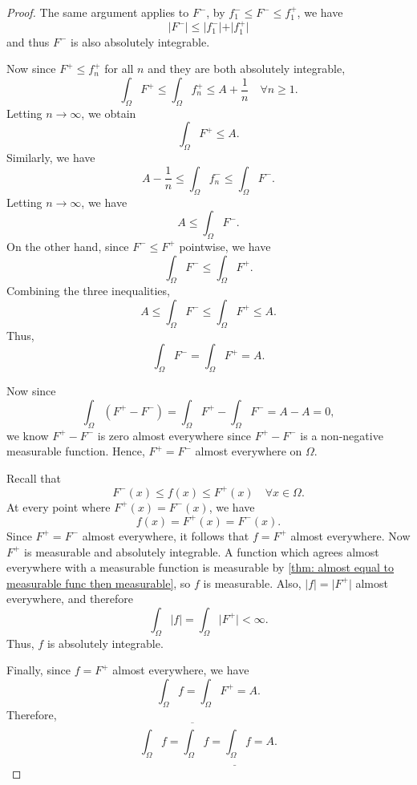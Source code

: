 \begin{proof}
    The same argument applies to \(F^-\), by \(f_1^- \le F^- \le f_1^+\), we have 
    \[
        \vert F^- \vert \le \vert f_1^- \vert + \vert f_1^+ \vert  
    \]   
    and thus \(F^-\) is also absolutely integrable.

    Now since \(F^+ \le f_n^+\) for all \(n\) and they are both absolutely integrable, 
    \[
        \int _\Omega F^+ \le \int _\Omega f_n^+ \le A + \frac{1}{n} \quad \forall n \ge 1.
    \]    
    Letting \(n \to \infty\), we obtain 
    \[
        \int _\Omega F^+ \le A.
    \] 
    Similarly, we have 
    \[
        A - \frac{1}{n} \le \int _\Omega f_n^- \le \int _\Omega F^-.
    \]
    Letting \(n \to \infty\), we have 
    \[
        A \le \int _\Omega F^-.
    \] 
    On the other hand, since \(F^- \le F^+\) pointwise, we have 
    \[
        \int _\Omega F^- \le \int _\Omega F^+.
    \] 
    Combining the three inequalities,
    \[
        A \le \int _\Omega F^- \le \int _\Omega F^+ \le A.
    \]
    Thus,
    \[
        \int _\Omega F^- = \int _\Omega F^+ = A.
    \]

    Now since 
    \[
        \int _\Omega (F^+ - F^-) = \int _\Omega F^+ - \int _\Omega F^- = A - A = 0,
    \]
    we know \(F^+ - F^-\) is zero almost everywhere since \(F^+ - F^-\) is a non-negative measurable function. Hence, \(F^+ = F^-\) almost everywhere on \(\Omega\).    

    Recall that 
    \[
        F^-(x) \le f(x) \le F^+(x) \quad \forall x \in \Omega.
    \]
    At every point where \(F^+(x) = F^-(x)\), we have 
    \[
        f(x) = F^+(x) = F^-(x).
    \]
    Since \(F^+ = F^-\) almost everywhere, it follows that \(f = F^+\) almost everywhere. Now \(F^+\) is measurable and absolutely integrable. A function which agrees almost everywhere with a measurable function is measurable by \autoref{thm: almost equal to measurable func then measurable}, so \(f\) is measurable. Also, \(\vert f \vert = \vert F^+ \vert  \) almost everywhere, and therefore 
    \[
        \int _\Omega \vert f \vert = \int _\Omega \vert F^+ \vert < \infty.  
    \]     
    Thus, \(f\) is absolutely integrable. 
    
    Finally, since \(f = F^+\) almost everywhere, we have 
    \[
        \int _\Omega f = \int _\Omega F^+ = A.
    \]
    Therefore,
    \[
        \int _\Omega f = \overline{\int _\Omega } f = \underline{\int _\Omega } f = A.  
    \]
\end{proof}

